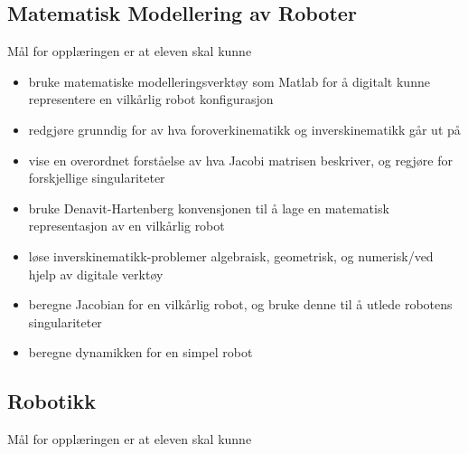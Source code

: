 \subsection*{Matematisk Modellering av Roboter}

    Mål for opplæringen er at eleven skal kunne

    \begin{itemize}
        \item bruke matematiske modelleringsverktøy som Matlab for å digitalt kunne representere en vilkårlig robot konfigurasjon
        \item redgjøre grunndig for av hva foroverkinematikk og inverskinematikk går ut på
        \item vise en overordnet forståelse av hva Jacobi matrisen beskriver, og regjøre for forskjellige singulariteter
        \item bruke Denavit-Hartenberg konvensjonen til å lage en matematisk representasjon av en vilkårlig robot
        \item løse inverskinematikk-problemer algebraisk, geometrisk, og numerisk/ved hjelp av digitale verktøy
        \item beregne Jacobian for en vilkårlig robot, og bruke denne til å utlede robotens singulariteter
        \item beregne dynamikken for en simpel robot
    \end{itemize}


\subsection*{Robotikk}

    Mål for opplæringen er at eleven skal kunne

